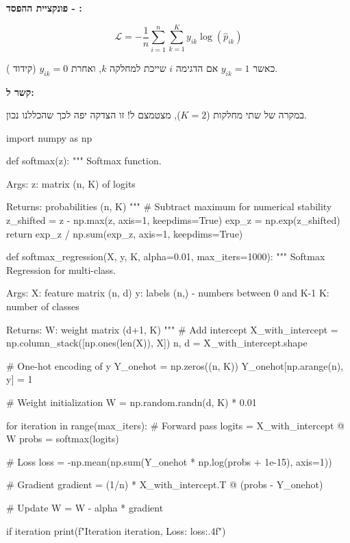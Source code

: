 \textbf{פונקציית ההפסד - :}

\begin{equation}
\mathcal{L} = -\frac{1}{n}\sum_{i=1}^{n}\sum_{k=1}^{K} y_{ik} \log(\hat{p}_{ik})
\end{equation}

כאשר $y_{ik} = 1$ אם הדגימה $i$ שייכת למחלקה $k$, ואחרת $y_{ik} = 0$ (קידוד ).

\textbf{קשר ל:}

במקרה של שתי מחלקות ($K=2$),  מצטמצם ל! זו הצדקה יפה לכך שהכללנו נכון.

\begin{pythonbox}
import numpy as np

def softmax(z):
    """
    Softmax function.

    Args:
        z: matrix (n, K) of logits

    Returns:
        probabilities (n, K)
    """
    # Subtract maximum for numerical stability
    z_shifted = z - np.max(z, axis=1, keepdims=True)
    exp_z = np.exp(z_shifted)
    return exp_z / np.sum(exp_z, axis=1, keepdims=True)

def softmax_regression(X, y, K, alpha=0.01, max_iters=1000):
    """
    Softmax Regression for multi-class.

    Args:
        X: feature matrix (n, d)
        y: labels (n,) - numbers between 0 and K-1
        K: number of classes

    Returns:
        W: weight matrix (d+1, K)
    """
    # Add intercept
    X_with_intercept = np.column_stack([np.ones(len(X)), X])
    n, d = X_with_intercept.shape

    # One-hot encoding of y
    Y_onehot = np.zeros((n, K))
    Y_onehot[np.arange(n), y] = 1

    # Weight initialization
    W = np.random.randn(d, K) * 0.01

    for iteration in range(max_iters):
        # Forward pass
        logits = X_with_intercept @ W
        probs = softmax(logits)

        # Loss
        loss = -np.mean(np.sum(Y_onehot * np.log(probs + 1e-15), axis=1))

        # Gradient
        gradient = (1/n) * X_with_intercept.T @ (probs - Y_onehot)

        # Update
        W = W - alpha * gradient

        if iteration %
            print(f"Iteration {iteration}, Loss: {loss:.4f}")


\end{pythonbox}
